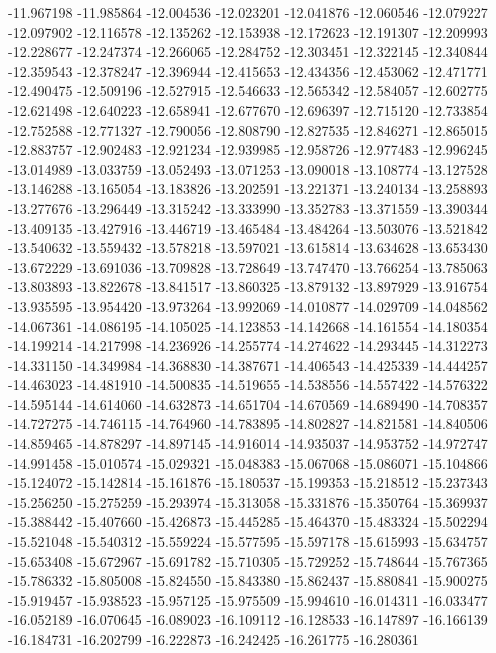 -11.967198
-11.985864
-12.004536
-12.023201
-12.041876
-12.060546
-12.079227
-12.097902
-12.116578
-12.135262
-12.153938
-12.172623
-12.191307
-12.209993
-12.228677
-12.247374
-12.266065
-12.284752
-12.303451
-12.322145
-12.340844
-12.359543
-12.378247
-12.396944
-12.415653
-12.434356
-12.453062
-12.471771
-12.490475
-12.509196
-12.527915
-12.546633
-12.565342
-12.584057
-12.602775
-12.621498
-12.640223
-12.658941
-12.677670
-12.696397
-12.715120
-12.733854
-12.752588
-12.771327
-12.790056
-12.808790
-12.827535
-12.846271
-12.865015
-12.883757
-12.902483
-12.921234
-12.939985
-12.958726
-12.977483
-12.996245
-13.014989
-13.033759
-13.052493
-13.071253
-13.090018
-13.108774
-13.127528
-13.146288
-13.165054
-13.183826
-13.202591
-13.221371
-13.240134
-13.258893
-13.277676
-13.296449
-13.315242
-13.333990
-13.352783
-13.371559
-13.390344
-13.409135
-13.427916
-13.446719
-13.465484
-13.484264
-13.503076
-13.521842
-13.540632
-13.559432
-13.578218
-13.597021
-13.615814
-13.634628
-13.653430
-13.672229
-13.691036
-13.709828
-13.728649
-13.747470
-13.766254
-13.785063
-13.803893
-13.822678
-13.841517
-13.860325
-13.879132
-13.897929
-13.916754
-13.935595
-13.954420
-13.973264
-13.992069
-14.010877
-14.029709
-14.048562
-14.067361
-14.086195
-14.105025
-14.123853
-14.142668
-14.161554
-14.180354
-14.199214
-14.217998
-14.236926
-14.255774
-14.274622
-14.293445
-14.312273
-14.331150
-14.349984
-14.368830
-14.387671
-14.406543
-14.425339
-14.444257
-14.463023
-14.481910
-14.500835
-14.519655
-14.538556
-14.557422
-14.576322
-14.595144
-14.614060
-14.632873
-14.651704
-14.670569
-14.689490
-14.708357
-14.727275
-14.746115
-14.764960
-14.783895
-14.802827
-14.821581
-14.840506
-14.859465
-14.878297
-14.897145
-14.916014
-14.935037
-14.953752
-14.972747
-14.991458
-15.010574
-15.029321
-15.048383
-15.067068
-15.086071
-15.104866
-15.124072
-15.142814
-15.161876
-15.180537
-15.199353
-15.218512
-15.237343
-15.256250
-15.275259
-15.293974
-15.313058
-15.331876
-15.350764
-15.369937
-15.388442
-15.407660
-15.426873
-15.445285
-15.464370
-15.483324
-15.502294
-15.521048
-15.540312
-15.559224
-15.577595
-15.597178
-15.615993
-15.634757
-15.653408
-15.672967
-15.691782
-15.710305
-15.729252
-15.748644
-15.767365
-15.786332
-15.805008
-15.824550
-15.843380
-15.862437
-15.880841
-15.900275
-15.919457
-15.938523
-15.957125
-15.975509
-15.994610
-16.014311
-16.033477
-16.052189
-16.070645
-16.089023
-16.109112
-16.128533
-16.147897
-16.166139
-16.184731
-16.202799
-16.222873
-16.242425
-16.261775
-16.280361
